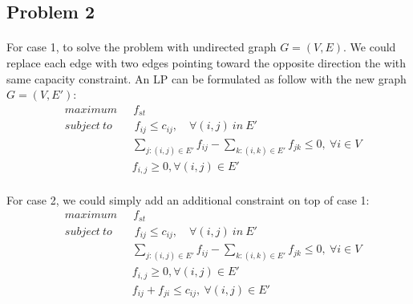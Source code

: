 \subsection*{Problem 2}
\paragraph{}
For case 1, to solve the problem with undirected graph $G=(V, E)$. We could replace each edge with two edges pointing toward the opposite direction the with same capacity constraint. An LP can be formulated as follow with the new graph $G=(V, E')$:
\begin{align*}
& maximum \quad \ \ f_{st}\\
& subject \ to \qquad f_{ij} \leq c_{ij}, \quad \forall (i, j) \ in \ E' \\
&\qquad \qquad \quad \quad \sum_{j:(i, j)\in E'} f_{ij} - \sum_{k:(i, k)\in E'} f_{jk} \leq 0, \ \forall i \in V \\
&\qquad \qquad \quad \quad f_{i, j} \geq 0, \forall (i, j) \in E'
\end{align*}
\paragraph{}
For case 2, we could simply add an additional constraint on top of case 1:
\begin{align*}
& maximum \quad \ \ f_{st}\\
& subject \ to \qquad f_{ij} \leq c_{ij}, \quad \forall (i, j) \ in \ E' \\
&\qquad \qquad \quad \quad \sum_{j:(i, j)\in E'} f_{ij} - \sum_{k:(i, k)\in E'} f_{jk} \leq 0, \ \forall i \in V \\
&\qquad \qquad \quad \quad f_{i, j} \geq 0, \forall (i, j) \in E'\\
&\qquad \qquad \quad \quad f_{ij} + f_{ji} \leq c_{ij}, \ \forall (i, j) \in E'
\end{align*}